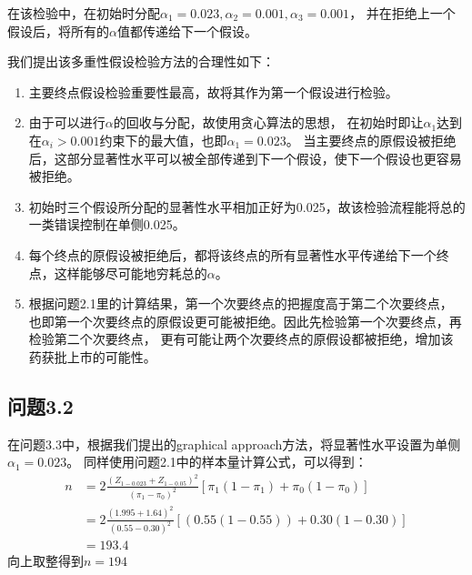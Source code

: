\documentclass{article}
\begin{document}

在该检验中，在初始时分配$\alpha_1=0.023,\alpha_2=0.001,\alpha_3=0.001$，
并在拒绝上一个假设后，将所有的$\alpha$值都传递给下一个假设。

我们提出该多重性假设检验方法的合理性如下：
\begin{enumerate}
    \item 主要终点假设检验重要性最高，故将其作为第一个假设进行检验。
    \item 由于可以进行$\alpha$的回收与分配，故使用贪心算法的思想，
        在初始时即让$\alpha_1$达到在$\alpha_i>0.001$约束下的最大值，也即$\alpha_1=0.023$。
        当主要终点的原假设被拒绝后，这部分显著性水平可以被全部传递到下一个假设，使下一个假设也更容易被拒绝。
    \item 初始时三个假设所分配的显著性水平相加正好为0.025，故该检验流程能将总的一类错误控制在单侧0.025。
    \item 每个终点的原假设被拒绝后，都将该终点的所有显著性水平传递给下一个终点，这样能够尽可能地穷耗总的$\alpha$。
    \item 根据问题2.1里的计算结果，第一个次要终点的把握度高于第二个次要终点，
        也即第一个次要终点的原假设更可能被拒绝。因此先检验第一个次要终点，再检验第二个次要终点，
        更有可能让两个次要终点的原假设都被拒绝，增加该药获批上市的可能性。
\end{enumerate}

\subsection{问题3.2}
在问题3.3中，根据我们提出的graphical approach方法，将显著性水平设置为单侧$\alpha_1=0.023$。
同样使用问题2.1中的样本量计算公式，可以得到：
\begin{align*}
    n &= 2\frac{(Z_{1-0.023}+Z_{1-0.05})^2}{(\pi_1-\pi_0)^2}\left[\pi_1(1-\pi_1)+\pi_0(1-\pi_0)\right]\\
      &= 2\frac{(1.995+1.64)^2}{(0.55-0.30)^2}
        \left[ (0.55(1-0.55)) + 0.30(1-0.30) \right]\\
      &= 193.4
\end{align*}
向上取整得到$n=194$
\end{document}
